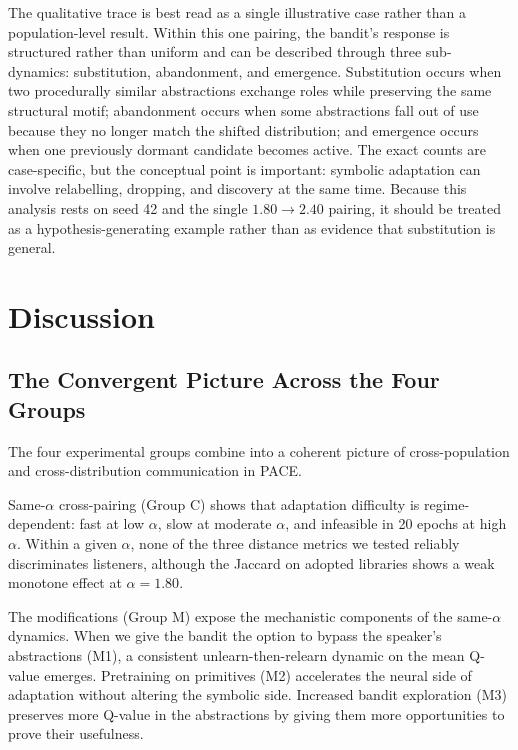 The qualitative trace is best read as a single illustrative case rather than a population-level result. Within this one pairing, the bandit's response is structured rather than uniform and can be described through three sub-dynamics: substitution, abandonment, and emergence. Substitution occurs when two procedurally similar abstractions exchange roles while preserving the same structural motif; abandonment occurs when some abstractions fall out of use because they no longer match the shifted distribution; and emergence occurs when one previously dormant candidate becomes active. The exact counts are case-specific, but the conceptual point is important: symbolic adaptation can involve relabelling, dropping, and discovery at the same time. Because this analysis rests on seed 42 and the single $1.80 \rightarrow 2.40$ pairing, it should be treated as a hypothesis-generating example rather than as evidence that substitution is general.

\section{Discussion}
\label{sec:rq3-discussion}

\subsection{The Convergent Picture Across the Four Groups}
\label{sec:rq3-convergent-picture}

The four experimental groups combine into a coherent picture of cross-population and cross-distribution communication in PACE.

Same-$\alpha$ cross-pairing (Group C) shows that adaptation difficulty is regime-dependent: fast at low $\alpha$, slow at moderate $\alpha$, and infeasible in 20 epochs at high $\alpha$. Within a given $\alpha$, none of the three distance metrics we tested reliably discriminates listeners, although the Jaccard on adopted libraries shows a weak monotone effect at $\alpha = 1.80$.

The modifications (Group M) expose the mechanistic components of the same-$\alpha$ dynamics. When we give the bandit the option to bypass the speaker's abstractions (M1), a consistent unlearn-then-relearn dynamic on the mean Q-value emerges. Pretraining on primitives (M2) accelerates the neural side of adaptation without altering the symbolic side. Increased bandit exploration (M3) preserves more Q-value in the abstractions by giving them more opportunities to prove their usefulness.

